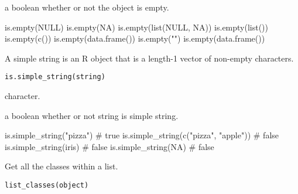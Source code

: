 \documentclass[a4paper]{book}
\begin{document}
%
\begin{Value}
a boolean whether or not the object is empty.
\end{Value}
%
\begin{Examples}
\begin{ExampleCode}
  is.empty(NULL)
  is.empty(NA)
  is.empty(list(NULL, NA))
  is.empty(list())
  is.empty(c())
  is.empty(data.frame())
  is.empty("")
  is.empty(data.frame())
\end{ExampleCode}
\end{Examples}
%
\begin{Description}\relax
A simple string is an R object that is a length-1 vector of non-empty characters.
\end{Description}
%
\begin{Usage}
\begin{verbatim}
is.simple_string(string)
\end{verbatim}
\end{Usage}
%
\begin{Arguments}
\begin{ldescription}
\item[\code{string}] character.
\end{ldescription}
\end{Arguments}
%
\begin{Value}
a boolean whether or not string is simple string.
\end{Value}
%
\begin{Examples}
\begin{ExampleCode}
  is.simple_string("pizza")              # true
  is.simple_string(c("pizza", "apple"))  # false
  is.simple_string(iris)                 # false
  is.simple_string(NA)                   # false
\end{ExampleCode}
\end{Examples}
%
\begin{Description}\relax
Get all the classes within a list.
\end{Description}
%
\begin{Usage}
\begin{verbatim}
list_classes(object)
\end{verbatim}
\end{Usage}
\end{document}
